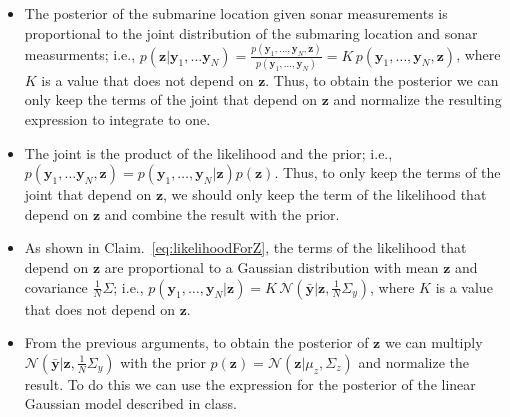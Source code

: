 \documentclass[12pt]{article}
\begin{document}
\begin{enumerate}[(a)]
\begin{itemize}
                \item The posterior of the submarine location given sonar
                    measurements is proportional to the joint distribution of
                    the submaring location and sonar measurments; i.e.,
                    $p(\mathbf{z}|\mathbf{y}_1,\ldots\mathbf{y}_N)=\frac{p(\mathbf{y}_1,\ldots,\mathbf{y}_N,\mathbf{z})}{p(\mathbf{y}_1,\ldots,\mathbf{y}_N)}=K\,p(\mathbf{y}_1,\ldots,\mathbf{y}_N,\mathbf{z})$,
                    where $K$ is a value that does not depend on $\mathbf{z}$. Thus, to
                    obtain the posterior we can only keep the terms of the
                    joint that depend on $\mathbf{z}$ and normalize the
                    resulting expression to integrate to one.

                \item The joint is the product of the likelihood and the prior;
                    i.e., 
                    $p(\mathbf{y}_1,\ldots\mathbf{y}_N,\mathbf{z})=p(\mathbf{y}_1,\ldots,\mathbf{y}_N|\mathbf{z})p(\mathbf{z})$.
                    Thus, to only keep the terms of the joint that depend
                    on $\mathbf{z}$, we should only keep the term of the likelihood
                    that depend on $\mathbf{z}$ and combine the result
                    with the prior.

                \item As shown in Claim.~\ref{eq:likelihoodForZ}, the terms of the
                    likelihood that depend on $\mathbf{z}$ are proportional to
                    a Gaussian distribution with mean $\mathbf{z}$ and
                    covariance $\frac{1}{N}\Sigma$; i.e., 
                    $p(\mathbf{y}_1,\ldots,\mathbf{y}_N|\mathbf{z})=K\,\mathcal{N}(\bar{\mathbf{y}}|\mathbf{z},\frac{1}{N}\Sigma_y)$,
                    where $K$ is a value that does not depend on $\mathbf{z}$.

                \item From the previous arguments, to obtain the posterior of
                    $\mathbf{z}$ we can multiply
                    $\mathcal{N}(\bar{\mathbf{y}}|\mathbf{z},\frac{1}{N}\Sigma_y)$
                    with the prior
                    $p(\mathbf{z})=\mathcal{N}(\mathbf{z}|\mu_z,\Sigma_z)$ and
                    normalize the result. To do this we can use the expression
                    for the posterior of the linear Gaussian model described in
                    class.

            \end{itemize}


\end{enumerate}
\end{document}
